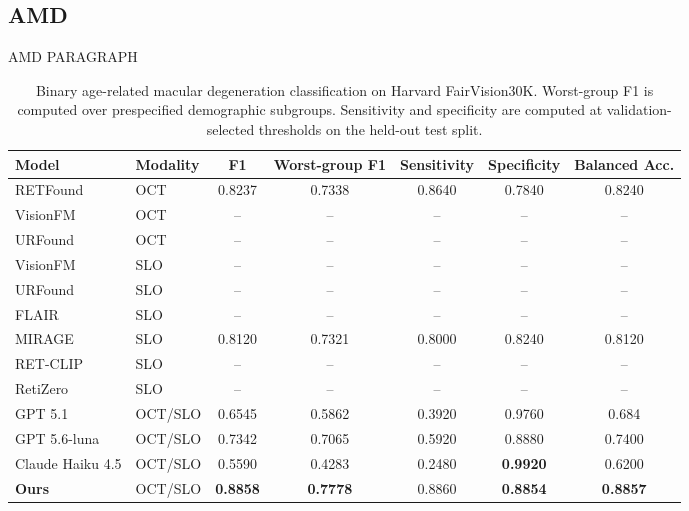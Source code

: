 \subsection{AMD}
AMD PARAGRAPH
\begin{table}[t]
\centering
\caption{Binary age-related macular degeneration classification on Harvard
FairVision30K. Worst-group F1 is computed over prespecified demographic
subgroups. Sensitivity and specificity are computed at validation-selected
thresholds on the held-out test split.}
\label{tab:amd_fairvision30k}
\begin{tabular}{@{}llccccc@{}}
\toprule
\textbf{Model} & \textbf{Modality} & \textbf{F1} &
\textbf{Worst-group F1} & \textbf{Sensitivity} &
\textbf{Specificity} & \textbf{Balanced Acc.} \\
\midrule
RETFound & OCT & 0.8237 & 0.7338 & 0.8640 & 0.7840 & 0.8240 \\
VisionFM & OCT & -- & -- & -- & -- & -- \\
URFound & OCT & -- & -- & -- & -- & -- \\
VisionFM & SLO & -- & -- & -- & -- & -- \\
URFound & SLO & -- & -- & -- & -- & -- \\
FLAIR & SLO & -- & -- & -- & -- & -- \\
MIRAGE & SLO & 0.8120 & 0.7321 & 0.8000 & 0.8240 & 0.8120 \\
RET-CLIP & SLO & -- & -- & -- & -- & -- \\
RetiZero & SLO & -- & -- & -- & -- & -- \\
GPT 5.1 & OCT/SLO & 0.6545 & 0.5862 & 0.3920 & 0.9760 & 0.684 \\
GPT 5.6-luna & OCT/SLO & 0.7342 & 0.7065 & 0.5920 & 0.8880 & 0.7400 \\
Claude Haiku 4.5 & OCT/SLO & 0.5590 & 0.4283 & 0.2480 & \textbf{0.9920} & 0.6200 \\
\textbf{Ours} & OCT/SLO & \textbf{0.8858} & \textbf{0.7778} & 0.8860 & \textbf{0.8854} & \textbf{0.8857} \\
\bottomrule
\end{tabular}
\end{table}
